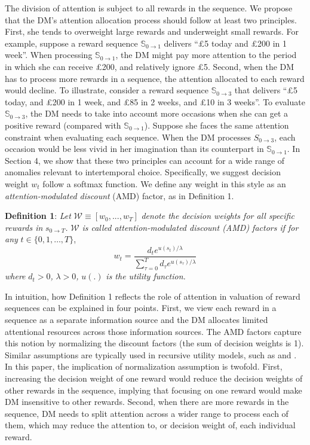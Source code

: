 \documentclass[
  12pt,
]{article}
\begin{document}
The division of attention is subject to all rewards in the sequence. We
propose that the DM's attention allocation process should follow at
least two principles. First, she tends to overweight large rewards and
underweight small rewards. For example, suppose a reward sequence
\(\mathbb{S}_{0\rightarrow1}\) delivers ``£5 today and £200 in 1 week''.
When processing \(\mathbb{S}_{0\rightarrow1}\), the DM might pay more
attention to the period in which she can receive £200, and relatively
ignore £5. Second, when the DM has to process more rewards in a
sequence, the attention allocated to each reward would decline. To
illustrate, consider a reward sequence \(\mathbb{S}_{0\rightarrow 3}\)
that delivers ``£5 today, and £200 in 1 week, and £85 in 2 weeks, and
£10 in 3 weeks''. To evaluate \(\mathbb{S}_{0\rightarrow 3}\), the DM
needs to take into account more occasions when she can get a positive
reward (compared with \(\mathbb{S}_{0\rightarrow1}\)). Suppose she faces
the same attention constraint when evaluating each sequence. When the DM
processes \(S_{0\rightarrow 3}\), each occasion would be less vivid in
her imagination than its counterpart in \(\mathbb{S}_{0\rightarrow1}\).
In Section 4, we show that these two principles can account for a wide
range of anomalies relevant to intertemporal choice. Specifically, we
suggest decision weight \(w_t\) follow a softmax function. We define any
weight in this style as an \emph{attention-modulated discount} (AMD)
factor, as in Definition 1.

\noindent \textbf{Definition 1}: \emph{Let}
\(\mathcal{W}\equiv[w_0,...,w_T]\) \emph{denote the decision weights for
all specific rewards in} \(s_{0\rightarrow T}\)\emph{.} \(\mathcal{W}\)
\emph{is called attention-modulated discount (AMD) factors if for any}
\(t\in\{0,1,…,T\}\),\[\tag{1}
w_t = \frac{d_te^{u(s_t)/\lambda}}{\sum_{\tau=0}^T d_\tau e^{u(s_\tau)/\lambda}} 
\]\emph{where} \(d_t > 0\)\emph{,} \(\lambda>0\)\emph{,} \(u(.)\)
\emph{is the utility function.}

In intuition, how Definition 1 reflects the role of attention in
valuation of reward sequences can be explained in four points. First, we
view each reward in a sequence as a separate information source and the
DM allocates limited attentional resources across those information
sources. The AMD factors capture this notion by normalizing the discount
factors (the sum of decision weights is 1). Similar assumptions are
typically used in recursive utility models, such as
\citet{weil1990nonexpected} and \citet{epstein1991substitution} . In
this paper, the implication of normalization assumption is twofold.
First, increasing the decision weight of one reward would reduce the
decision weights of other rewards in the sequence, implying that
focusing on one reward would make DM insensitive to other rewards.
Second, when there are more rewards in the sequence, DM needs to split
attention across a wider range to process each of them, which may reduce
the attention to, or decision weight of, each individual reward.
\end{document}
